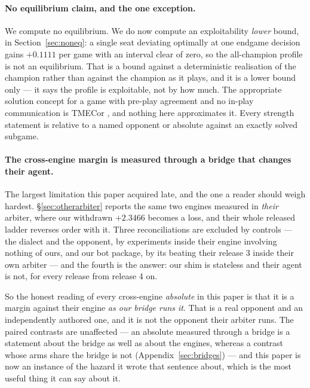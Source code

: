 \documentclass[11pt,letterpaper]{article}
\begin{document}
\paragraph{No equilibrium claim, and the one exception.} We compute no
equilibrium. We do now compute an exploitability \emph{lower} bound, in
Section~\ref{sec:noneq}: a single seat deviating optimally at one endgame
decision gains $+0.1111$ per game with an
interval clear of zero, so the all-champion profile is not an equilibrium. That
is a bound against a deterministic realisation of the champion rather than
against the champion as it plays, and it is a lower bound only --- it says the
profile is exploitable, not by how much. The appropriate solution concept for a game with pre-play
agreement and no in-play communication is TMECor
\citep{celli2018computational}, and nothing here approximates it. Every strength
statement is relative to a named opponent or absolute against an exactly solved
subgame.

\paragraph{The cross-engine margin is measured through a bridge that changes
their agent.} The largest limitation this paper acquired late, and the one a
reader should weigh hardest. \S\ref{sec:otherarbiter} reports the same two
engines measured in \emph{their} arbiter, where our withdrawn $+2.3466$ becomes a loss,
and their whole released ladder reverses order with it. Three reconciliations
are excluded by controls --- the dialect and the opponent, by experiments inside
their engine involving nothing of ours, and our bot package, by its beating
their release 3 inside their own arbiter --- and the fourth is the answer: our shim
is stateless and their agent is not, for every release from release 4 on.

So the honest reading of every cross-engine \emph{absolute} in this paper is
that it is a margin against their engine \emph{as our bridge runs it}. That is a
real opponent and an independently authored one, and it is not the opponent
their arbiter runs. The paired contrasts are unaffected --- an absolute measured
through a bridge is a statement about the bridge as well as about the engines,
whereas a contrast whose arms share the bridge is not
(Appendix~\ref{sec:bridges}) --- and this paper is now an instance of the hazard
it wrote that sentence about, which is the most useful thing it can say about
it.
\end{document}
